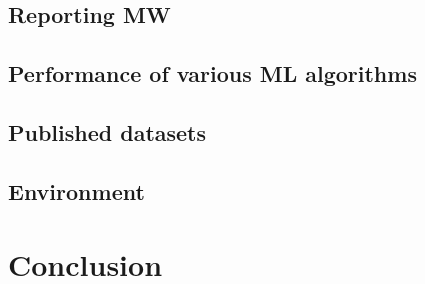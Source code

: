 \documentclass[conference, a4paper]{IEEEtran}
\begin{document}
\subsection{Reporting MW} \label{sec:reporting}


\subsection{Performance of various ML algorithms} \label{sec:performance}


\subsection{Published datasets}


\subsection{Environment}


\section{Conclusion}





\clearpage
\appendices
\section{}

\end{document}
